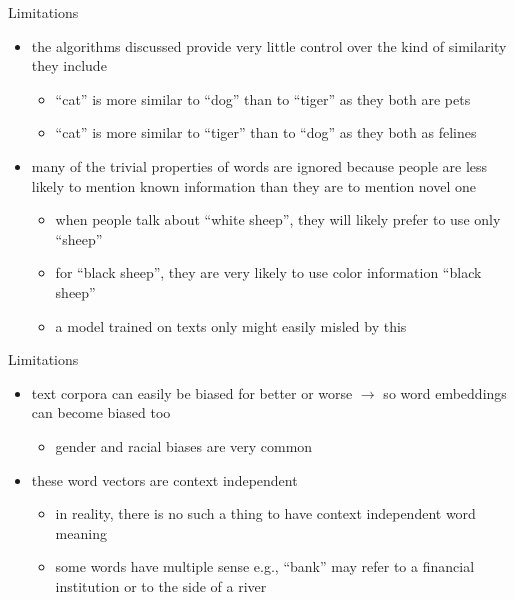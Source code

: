 \begin{frame}{Limitations}
 \begin{itemize}
     \item<1-> the algorithms discussed provide very little control over the kind of similarity they include
     \begin{itemize}
         \item<2-> ``cat'' is more similar to ``dog'' than to ``tiger'' as they both are pets
         \item<3-> ``cat'' is more similar to ``tiger'' than to ``dog'' as they both as felines
     \end{itemize}
     \item<4-> many of the trivial properties of words are ignored because people are less likely to mention known information than they are to mention novel one
     \begin{itemize}
         \item<5-> when people talk about ``white sheep'', they will likely prefer to use only ``sheep''
         \item<6-> for ``black sheep'', they are very likely to use color information ``black sheep''
         \item<7-> a model trained on texts only might easily misled by this
     \end{itemize}
 \end{itemize}
\end{frame}
\begin{frame}{Limitations}\begin{itemize}
     \item<1-> text corpora can easily be biased for better or worse $\rightarrow$  so word embeddings can become biased too
     \begin{itemize}
         \item<2-> gender and racial biases are very common
     \end{itemize}
     \item<3-> these word vectors are context independent
     \begin{itemize}
         \item<4-> in reality, there is no such a thing to have context independent word meaning
         \item<5-> some words have multiple sense e.g., ``bank'' may refer to a financial institution or to the side of a river
     \end{itemize}
 \end{itemize}
\end{frame}
 